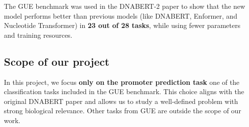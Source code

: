 The GUE benchmark was used in the DNABERT-2 paper to show that the new model performs better than previous models (like DNABERT, Enformer, and Nucleotide Transformer) in \textbf{23 out of 28 tasks}, while using fewer parameters and training resources.

\subsection{Scope of our project}

In this project, we focus \textbf{only on the promoter prediction task} one of the classification tasks included in the GUE benchmark. This choice aligns with the original DNABERT paper and allows us to study a well-defined problem with strong biological relevance. Other tasks from GUE are outside the scope of our work.
